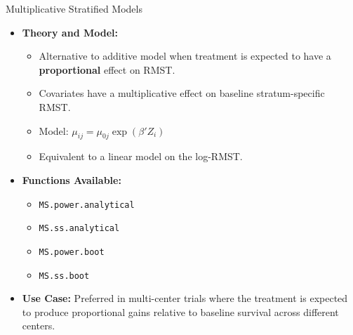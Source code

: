 \documentclass{beamer}
\begin{document}
\begin{frame}{Multiplicative Stratified Models}
\begin{itemize}
    \item \textbf{Theory and Model:}
    \begin{itemize}
        \item Alternative to additive model when treatment is expected to have a \textbf{proportional} effect on RMST.
        \item Covariates have a multiplicative effect on baseline stratum-specific RMST.
        \item Model: $\mu_{ij} = \mu_{0j} \exp(\beta'Z_i)$
        \item Equivalent to a linear model on the log-RMST.
    \end{itemize}
    \item \textbf{Functions Available:}
    \begin{itemize}
        \item \texttt{MS.power.analytical}
        \item \texttt{MS.ss.analytical}
        \item \texttt{MS.power.boot}
        \item \texttt{MS.ss.boot}
    \end{itemize}
    \item \textbf{Use Case:} Preferred in multi-center trials where the treatment is expected to produce proportional gains relative to baseline survival across different centers.
\end{itemize}
\end{frame}
\end{document}
